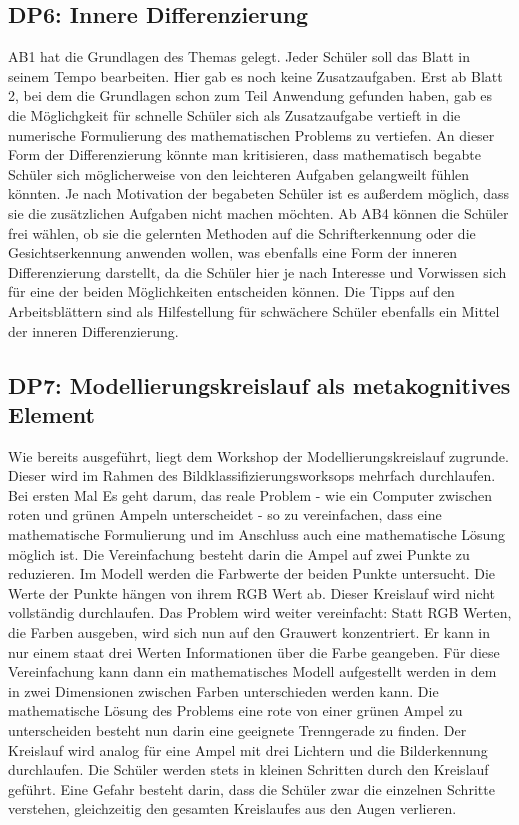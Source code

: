         \subsection{DP6: Innere Differenzierung}
            AB1 hat die Grundlagen des Themas gelegt. Jeder Schüler soll das Blatt in seinem Tempo bearbeiten. Hier gab es noch keine Zusatzaufgaben.
            Erst ab Blatt 2, bei dem die Grundlagen schon zum Teil Anwendung gefunden haben, gab es die Möglichgkeit für schnelle Schüler sich als Zusatzaufgabe vertieft in die numerische Formulierung des mathematischen Problems zu vertiefen.
            An dieser Form der Differenzierung könnte man kritisieren, dass mathematisch begabte Schüler sich möglicherweise von den leichteren Aufgaben gelangweilt fühlen könnten. Je nach Motivation der begabeten Schüler ist es außerdem möglich, dass sie die zusätzlichen Aufgaben nicht machen möchten.
            Ab AB4 können die Schüler frei wählen, ob sie die gelernten Methoden auf die Schrifterkennung oder die Gesichtserkennung anwenden wollen, was ebenfalls eine Form der inneren Differenzierung darstellt, da die Schüler hier je nach Interesse und Vorwissen sich für eine der beiden Möglichkeiten entscheiden können.
            Die Tipps auf den Arbeitsblättern sind als Hilfestellung für schwächere Schüler ebenfalls ein Mittel der inneren Differenzierung.
        \subsection{DP7: Modellierungskreislauf als metakognitives Element}

            Wie bereits ausgeführt, liegt dem Workshop der Modellierungskreislauf zugrunde. Dieser wird im Rahmen des Bildklassifizierungsworksops mehrfach durchlaufen. Bei ersten Mal Es geht darum, das reale Problem - wie ein Computer zwischen roten und grünen Ampeln unterscheidet - so zu vereinfachen, dass eine mathematische Formulierung und im Anschluss auch eine mathematische Lösung möglich ist. Die Vereinfachung besteht darin die Ampel auf zwei Punkte zu reduzieren. Im Modell werden die Farbwerte der  beiden Punkte untersucht. Die Werte der Punkte hängen von ihrem RGB Wert ab.
            Dieser Kreislauf wird nicht vollständig durchlaufen. Das Problem wird weiter vereinfacht: Statt RGB Werten, die Farben ausgeben, wird sich nun auf den Grauwert konzentriert. Er kann in nur einem staat drei Werten Informationen über die Farbe geangeben. Für diese Vereinfachung kann dann ein mathematisches Modell aufgestellt werden in dem in zwei Dimensionen zwischen Farben unterschieden werden kann. Die mathematische Lösung des Problems eine rote von einer grünen Ampel zu unterscheiden besteht nun darin eine geeignete Trenngerade zu finden.
            Der Kreislauf wird analog für eine Ampel mit drei Lichtern und die Bilderkennung durchlaufen.
            Die Schüler werden stets in kleinen Schritten durch den Kreislauf geführt. Eine Gefahr besteht darin, dass die Schüler zwar die einzelnen Schritte verstehen, gleichzeitig den gesamten Kreislaufes aus den Augen verlieren.






